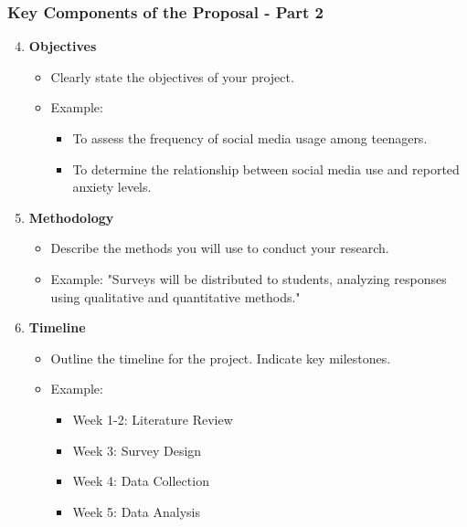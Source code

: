 \documentclass{beamer}
\begin{document}
\begin{frame}[fragile]
    \frametitle{Key Components of the Proposal - Part 2}
    \begin{enumerate}
        \setcounter{enumi}{3}
        \item \textbf{Objectives}
            \begin{itemize}
                \item Clearly state the objectives of your project.
                \item Example:
                    \begin{itemize}
                        \item To assess the frequency of social media usage among teenagers.
                        \item To determine the relationship between social media use and reported anxiety levels.
                    \end{itemize}
            \end{itemize}

        \item \textbf{Methodology}
            \begin{itemize}
                \item Describe the methods you will use to conduct your research.
                \item Example: "Surveys will be distributed to students, analyzing responses using qualitative and quantitative methods."
            \end{itemize}

        \item \textbf{Timeline}
            \begin{itemize}
                \item Outline the timeline for the project. Indicate key milestones.
                \item Example:
                    \begin{itemize}
                        \item Week 1-2: Literature Review
                        \item Week 3: Survey Design
                        \item Week 4: Data Collection
                        \item Week 5: Data Analysis
                    \end{itemize}
            \end{itemize}
    \end{enumerate}
\end{frame}
\end{document}
